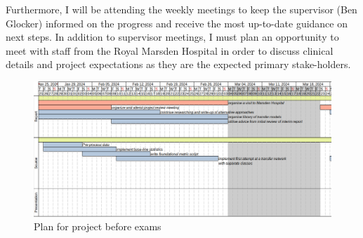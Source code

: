\documentclass[11pt,twoside]{report}
\begin{document}
Furthermore, I will be attending the weekly meetings to keep the supervisor (Ben Glocker) informed on the progress and receive the most up-to-date guidance on next steps. In addition to supervisor meetings, I must plan an opportunity to meet with staff from the Royal Marsden Hospital in order to discuss clinical details and project expectations as they are the expected primary stake-holders.

\begin{figure}[H]
  \centering
  \includegraphics[width=\linewidth, trim={1px 0cm 0.28cm 0}, clip]{gantt/plan-pre-exam.png}
  \caption{Plan for project before exams}
  \label{fig:plan-pre-exam}
\end{figure}
\end{document}

